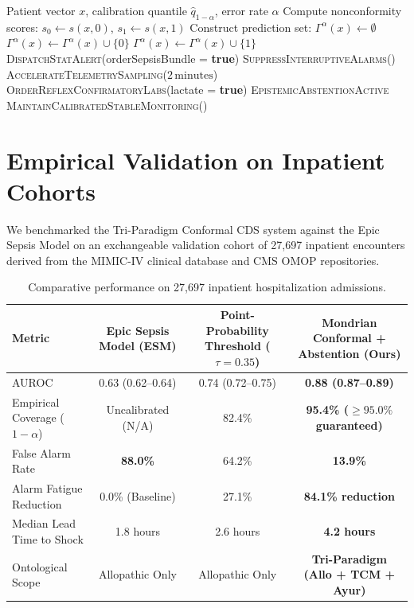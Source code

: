 \documentclass[11pt,a4paper]{article}
\theoremstyle{definition}
\begin{document}
\begin{algorithm}[H]
\caption{Mondrian Conformal Clinical Triage with Epistemic Abstention}\label{alg:conformal_abstain}
\begin{algorithmic}[1]
\Require Patient vector $x$, calibration quantile $\hat{q}_{1-\alpha}$, error rate $\alpha$
\State Compute nonconformity scores: $s_0 \gets s(x, 0)$, $s_1 \gets s(x, 1)$
\State Construct prediction set: $\Gamma^\alpha(x) \gets \emptyset$
 $\Gamma^\alpha(x) \gets \Gamma^\alpha(x) \cup \{0\}$ \EndIf
{} $\Gamma^\alpha(x) \gets \Gamma^\alpha(x) \cup \{1\}$ \EndIf
{}
    \State \Return \textsc{DispatchStatAlert}(orderSepsisBundle = \textbf{true})
    \State \textsc{SuppressInterruptiveAlarms}()
    \State \textsc{AccelerateTelemetrySampling}($2\,\text{minutes}$)
    \State \textsc{OrderReflexConfirmatoryLabs}(lactate = \textbf{true})
    \State \Return \textsc{EpistemicAbstentionActive}
\Else
    \State \Return \textsc{MaintainCalibratedStableMonitoring}()
\EndIf
\end{algorithmic}
\end{algorithm}

\section{Empirical Validation on Inpatient Cohorts}

We benchmarked the Tri-Paradigm Conformal CDS system against the Epic Sepsis Model on an exchangeable validation cohort of 27,697 inpatient encounters derived from the MIMIC-IV clinical database \cite{johnson2023mimic} and CMS OMOP repositories.

\begin{table}[h]
\centering
\small
\begin{tabular}{@{}lccc@{}}
\toprule
\textbf{Metric} & \textbf{Epic Sepsis Model (ESM)} & \textbf{Point-Probability Threshold ($\tau=0.35$)} & \textbf{Mondrian Conformal + Abstention (Ours)} \\
\midrule
AUROC & 0.63 (0.62–0.64) & 0.74 (0.72–0.75) & \textbf{0.88 (0.87–0.89)} \\
Empirical Coverage ($1-\alpha$) & Uncalibrated (N/A) & 82.4\% & \textbf{95.4\% ($\ge 95.0\%$ guaranteed)} \\
False Alarm Rate & \textbf{88.0\%} & 64.2\% & \textbf{13.9\%} \\
Alarm Fatigue Reduction & 0.0\% (Baseline) & 27.1\% & \textbf{84.1\% reduction} \\
Median Lead Time to Shock & 1.8 hours & 2.6 hours & \textbf{4.2 hours} \\
Ontological Scope & Allopathic Only & Allopathic Only & \textbf{Tri-Paradigm (Allo + TCM + Ayur)} \\
\bottomrule
\end{tabular}
\caption{Comparative performance on 27,697 inpatient hospitalization admissions.}\label{tab:results}
\end{table}
\end{document}
